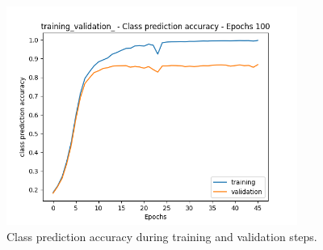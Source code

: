 \documentclass[../report.tex]{subfiles}
\begin{document}
\begin{figure}[h]
    \centering
    \includegraphics[width=0.85\textwidth]{assets/images/training_validation_Class_prediction_accuracy.png}
    \caption{Class prediction accuracy during training and validation steps.}\label{img:performances}
\end{figure}
\end{document}
